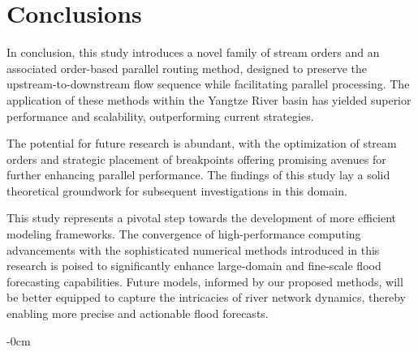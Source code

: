 \documentclass[water,article,submit,pdftex,moreauthors]{Definitions/mdpi}
\begin{document}
\section{Conclusions}
\label{sec:conclusions}

In conclusion, this study introduces a novel family of stream orders and an associated order-based parallel routing method, designed to preserve the upstream-to-downstream flow sequence while facilitating parallel processing. The application of these methods within the Yangtze River basin has yielded superior performance and scalability, outperforming current strategies.

The potential for future research is abundant, with the optimization of stream orders and strategic placement of breakpoints offering promising avenues for further enhancing parallel performance. The findings of this study lay a solid theoretical groundwork for subsequent investigations in this domain.

This study represents a pivotal step towards the development of more efficient modeling frameworks. The convergence of high-performance computing advancements with the sophisticated numerical methods introduced in this research is poised to significantly enhance large-domain and fine-scale flood forecasting capabilities. Future models, informed by our proposed methods, will be better equipped to capture the intricacies of river network dynamics, thereby enabling more precise and actionable flood forecasts.

\vspace{6pt}





\begin{adjustwidth}{-\extralength}{0cm}


    

    \PublishersNote{}
\end{adjustwidth}
\end{document}
